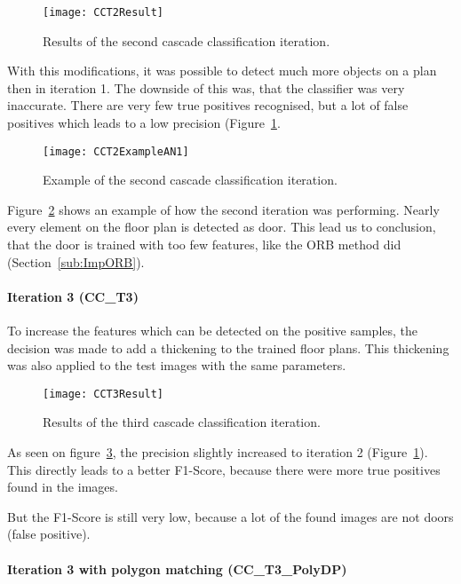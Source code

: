 \begin{figure}[H]
	\centering
	\texttt{[image: CCT2Result]}
	\caption{Results of the second cascade classification iteration.}
	\label{fig:CCT2Result}
\end{figure}

With this modifications, it was possible to detect much more objects on a plan then in iteration 1. The downside of this was, that the classifier was very inaccurate. There are very few true positives recognised, but a lot of false positives which leads to a low precision (Figure~\ref{fig:CCT2Result}.

\begin{figure}[H]
	\centering
	\texttt{[image: CCT2ExampleAN1]}
	\caption{Example of the second cascade classification iteration.}
	\label{fig:CCT2ExampleAN1}
\end{figure}

Figure~\ref{fig:CCT2ExampleAN1} shows an example of how the second iteration was performing. Nearly every element on the floor plan is detected as door. This lead us to conclusion, that the door is trained with too few features, like the ORB method did (Section~\ref{sub:ImpORB}).

\paragraph{Iteration 3 (CC\_T3)}
\label{sub:CCT3}

To increase the features which can be detected on the positive samples, the decision was made to add a thickening to the trained floor plans. This thickening was also applied to the test images with the same parameters.

\begin{figure}[H]
	\centering
	\texttt{[image: CCT3Result]}
	\caption{Results of the third cascade classification iteration.}
	\label{fig:CCT3Result}
\end{figure}

As seen on figure~\ref{fig:CCT3Result}, the precision slightly increased to iteration 2 (Figure~\ref{fig:CCT2Result}). This directly leads to a better F1-Score, because there were more true positives found in the images.

But the F1-Score is still very low, because a lot of the found images are not doors (false positive).

\paragraph{Iteration 3 with polygon matching (CC\_T3\_PolyDP)}
\label{sub:CCT3PolyDP}
\label{sub:PolyDP}

